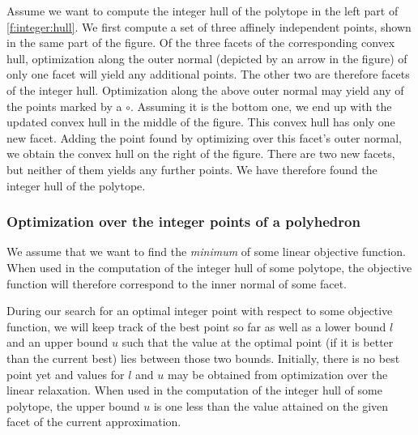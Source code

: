 \begin{example}
Assume we want to compute the integer hull of the polytope in the left part
of \autoref{f:integer:hull}.
We first compute a set of three affinely independent points,
shown in the same part of the figure.
Of the three facets of the corresponding convex hull,
optimization along the outer normal (depicted by an arrow in the figure)
of only one facet will yield any additional points.  The other two
are therefore facets of the integer hull.
Optimization along the above outer normal may yield any of the
points marked by a $\circ$.
Assuming it is the bottom one, we end up with the updated
convex hull in the middle of the figure.  This convex hull
has only one new facet.  Adding the point found by optimizing
over this facet's outer normal, we obtain the convex hull
on the right of the figure.
There are two new facets, but neither of them yields any
further points.  We have therefore found the integer hull
of the polytope.
\end{example}

\subsubsection{Optimization over the integer points of a polyhedron}
\label{s:optimization}

We assume that we want to find the {\em minimum} of
some linear objective function.  When used in the computation
of the integer hull of some polytope, the objective function
will therefore correspond to the inner normal of some facet.

During our search for an optimal integer point with respect
to some objective function, we will keep track of the best
point so far as well as a lower bound $l$
and an upper bound $u$ such that the value at the optimal point
(if it is better than the current best) lies between those
two bounds.
Initially, there is no best point yet and values for $l$ and $u$
may be obtained from optimization over the linear relaxation.
When used in the computation of the integer hull of some polytope,
the upper bound $u$ is one less than the value attained on
the given facet of the current approximation.

